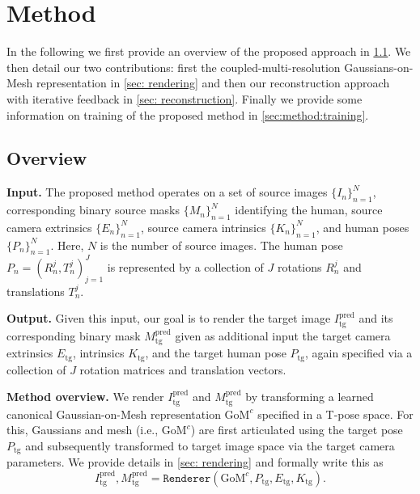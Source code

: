 \section{Method}
In the following we first provide an overview of the proposed approach in \cref{sec:method:overview}. We then detail our two contributions: first the coupled-multi-resolution Gaussians-on-Mesh representation in \cref{sec: rendering} and then our reconstruction approach with iterative feedback in \cref{sec: reconstruction}. Finally we provide some information on training of the proposed method in \cref{sec:method:training}.

\subsection{Overview}
\label{sec:method:overview}
\textbf{Input.} The proposed method operates on a set of source images $\{I_n\}_{n=1}^N$, corresponding binary source masks $\{M_n\}_{n=1}^N$ identifying the human, source camera extrinsics $\{E_n\}_{n=1}^N$, source camera intrinsics $\{K_n\}_{n=1}^N$, and human poses $\{P_n\}_{n=1}^N$. Here, $N$ is the number of source images. The human pose $P_n=(R_n^j, T_n^j)_{j=1}^J$ is represented by a collection of $J$ rotations $R_n^j$ and translations $T_n^j$. %

\textbf{Output.} Given this input, our goal is to render the target image $I_\text{tg}^\text{pred}$ and its corresponding binary mask $M_\text{tg}^\text{pred}$ given as additional input the target camera extrinsics $E_\text{tg}$, intrinsics $K_\text{tg}$, and the target human pose $P_\text{tg}$, again specified via a collection of $J$ rotation matrices and translation vectors.

\textbf{Method overview.}
We render $I_\text{tg}^\text{pred}$ and $M_\text{tg}^\text{pred}$ by transforming a learned canonical Gaussian-on-Mesh representation $\text{GoM}^c$ %
specified in a  T-pose space. For this, Gaussians and  mesh (i.e., $\text{GoM}^c$) are first articulated using the target pose $P_\text{tg}$ and subsequently transformed to target image space via the target camera parameters. We provide details in \cref{sec: rendering} and formally write this as
    \begin{equation}
        I_\text{tg}^\text{pred}, M_\text{tg}^\text{pred} = \texttt{Renderer}(\text{GoM}^c, P_\text{tg}, E_\text{tg}, K_\text{tg}).
        \label{eq:render}
    \end{equation}

